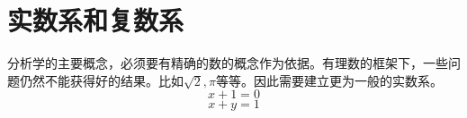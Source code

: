 \section[1]{实数系和复数系}
分析学的主要概念，必须要有精确的数的概念作为依据。有理数的框架下，一些问题仍然不能获得好的结果。比如$\sqrt{2},\pi$等等。因此需要建立更为一般的实数系。
\[
    x+1 =0
\]
\begin{equation}\label{1.1}
    x+y = 1
\end{equation}